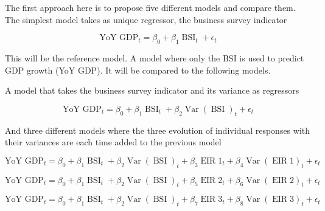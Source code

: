 \documentclass[12pt,a4paper,oneside]{book}
\DeclareMathOperator{\Var}{Var}
\DeclareMathOperator{\BSI}{BSI}
\DeclareMathOperator{\EIR}{EIR}
\begin{document}
The first approach here is to propose five different models and compare them.
The simplest model takes as unique regressor, the business survey indicator

\begin{equation} \tag{Model 1}
    \text{YoY GDP}_{t} = \beta_0 + \beta_{1} \BSI_{t} + \epsilon_t \label{eq:model1}
\end{equation}

This will be the reference model. A model where only the BSI is used to predict GDP growth (YoY GDP). It will be compared to the following models.

A model that takes the business survey indicator and its variance as regressors

\begin{equation} \tag{Model 2}
    \text{YoY GDP}_{t} = \beta_0 + \beta_{1} \BSI_{t} + \beta_{2} \Var(\BSI)_{t} + \epsilon_t \label{eq:model2}
\end{equation}

And three different models where the three evolution of individual responses with their variances are each time added to the previous model

\begin{equation} \tag{Model 3}
    \text{YoY GDP}_{t} = \beta_0 + \beta_{1} \BSI_{t}  + \beta_{2} \Var(\BSI)_{t} + \beta_{3} \EIR1_{t}  + \beta_{4} \Var(\EIR1)_{t} + \epsilon_t \label{eq:model3}
\end{equation}

\begin{equation} \tag{Model 4}
    \text{YoY GDP}_{t} = \beta_0 + \beta_{1} \BSI_{t}  + \beta_{2} \Var(\BSI)_{t} + \beta_{5} \EIR2_{t}  + \beta_{6} \Var(\EIR2)_{t} + \epsilon_t \label{eq:model4}
\end{equation}

\begin{equation} \tag{Model 5}
    \text{YoY GDP}_{t} = \beta_0 + \beta_{1} \BSI_{t}  + \beta_{2} \Var(\BSI)_{t} + \beta_{7} \EIR3_{t}  + \beta_{8} \Var(\EIR3)_{t} + \epsilon_t  \label{eq:model5}
\end{equation}
\end{document}
